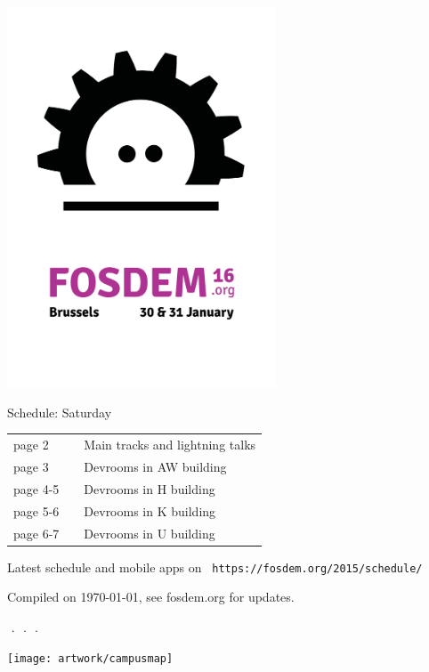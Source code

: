 \documentclass[a4paper,10pt]{article}
\begin{document}
\label{cover}
\begin{center}
\includegraphics[width=0.6\textwidth]{artwork/flyer_nobg}


{\fontsize{35}{45}\selectfont
\bf

Schedule: Saturday
}

\vfill

{\Large
\begin{tabular}{lll}
page 2   & &  Main tracks and lightning talks \\
page 3   & &  Devrooms in AW building \\
page 4-5 & &  Devrooms in H building \\
page 5-6 & &  Devrooms in K building \\
page 6-7 & &  Devrooms in U building \\
\end{tabular}

\vfill

Latest schedule and mobile apps on ~\texttt{https://fosdem.org/2015/schedule/}
}

\vfill

\end{center}

Compiled on {\ddmmyyyydate\today}, see fosdem.org for updates.


{%
\fontsize{10.5}{7.80}\selectfont%
\renewcommand{\arraystretch}{0.88}%
%
%
}



\pagestyle{empty}
\pagebreak
$ $ .
\pagebreak
$ $ .
\pagebreak
$ $ .
\pagebreak


\label{backcover}%
\texttt{[image: artwork/campusmap]}
\end{document}
